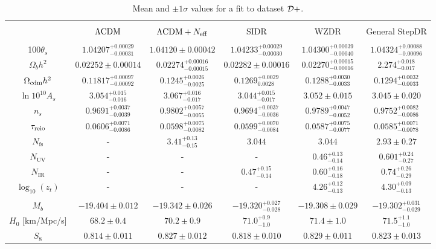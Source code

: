 \documentclass[aps,prd,twocolumn,nofootinbib,superscriptaddress]{revtex4}
\newcommand{\D}{\cal{D}}
\newcommand{\nir}{N_\text{IR}}
\newcommand{\nuv}{N_\text{UV}}
\newcommand{\nfs}{N_\text{fs}}
\newcommand{\zt}{z_t}
\newcommand{\Neff}{N_{\rm eff}}
\begin{document}
\begin{table*}[h!]{ }
	\centering
	\begin{tabular}{|c | c | c | c | c | c |} 
		\hline &&&&&\\[-8pt]
		& $\Lambda{\rm CDM}$ & $ \Lambda{\rm CDM} + \Neff$ & SIDR &  WZDR & General StepDR  \\
		\hline &&&&&\\[-8pt]
		100$\theta_s$ & $1.04207 ^{+0.00029}_{-0.00031}$ & $1.04120 \pm 0.00042$ & $1.04233^{+0.00029}_{-0.00030}$ & $1.04300^{+0.00039}_{-0.00040}$ & $1.04324^{+0.00088}_{-0.00096}$  \\  [3pt]
		$\Omega_b h^2$ & $0.02252\pm 0.00014 $ & $0.02274^{+0.00016}_{-0.00015}$  & $0.02282 \pm  0.00016 $ &  $0.02270^{+0.00015}_{-0.00016}$ &$ 2.274^{+0.018}_{-0.017} $   \\ [3pt]
		$ \Omega_{\rm cdm}h^2$ & $ 0.11817^{+0.00097}_{-0.00092}$ & $0.1245^{+0.0026}_{-0.0025}$ & $0.1269^{+0.0029}_{0.0028} $ & $0.1288^{+0.0030}_{-0.0033}$ & $0.1294^{+0.0032}_{-0.0033} $\\ [3pt]
		$\ln 10^{10} A_s$  &	$3.054^{+0.015}_{-0.016} $ & $3.067^{+0.016}_{-0.017} $ & $3.044^{+0.015}_{-0.017} $ & $3.052 \pm 0.015 $ &$3.045 \pm 0.020 $ \\ [3pt]
		$n_s$ & $0.9691^{+0.0037}_{-0.0039}$& $0.9802^{+0.0057}_{-0.0055} $ & $0.9694^{+0.0037}_{-0.0036} $ & $0.9789^{+0.0047}_{-0.0052} $ &$0.9752^{+0.0082}_{-0.0086}$\\ [3pt]
		$\tau_{\rm reio}$ &$0.0606^{+0.0071}_{-0.0086}$ & $0.0598^{+0.0075}_{-0.0082} $ & $0.0599^{+0.0070}_{-0.0084} $ & $0.0587^{+0.0075}_{-0.0077} $ &$0.0585^{+0.0071}_{-0.0078}$ \\ [3pt]
		$\nfs   $  &- & $3.41 ^{+0.13}_{-0.15} $ & $3.044$ & $3.044 $& $2.93 \pm 0.27 $  \\ [3pt]
		$\nuv $  &-&-&-& $0.46^{+0.13}_{-0.14} $ & $0.601^{+0.24}_{-0.27} $  \\ [3pt]			
		$\nir $  &- &-& $0.47^{+0.15}_{-0.14} $ & $0.60^{+0.16}_{-0.18}$ & $0.74^{+0.26}_{-0.29} $  \\ [3pt]
		$\log_{10} (\zt)$  &- &- &- & $4.26^{+0.12}_{-0.13} $ & $4.30^{+0.09}_{-0.13} $ \\ [3pt] \hline	 &&&&&\\[-8pt]
		$M_b $ & ${-19.404} \pm 0.012 $ & $ {-19.342} \pm 0.026 $ & $ {-19.320}^{+0.027}_{-0.028}$ & $ {-19.308} \pm 0.029$ & ${-19.302}^{+0.031}_{-0.029} $ \\ [3pt]
		$H_0$ [km/Mpc/s] & $68.2 \pm 0.4 $ &  $70.2 \pm 0.9 $ & $71.0^{+0.9}_{-1.0} $ & $71.4 \pm 1.0 $ & $71.5^{+1.1}_{-1.0} $ \\ [3pt]
		$S_8$ & $0.814  \pm 0.011 $& $0.827 \pm 0.012 $ & $0.818 \pm 0.010 $ & $0.829 \pm 0.011 $ &$0.823 \pm 0.013$  \\  [3pt] \hline
		
	\end{tabular}
	\caption{Mean and $\pm 1 \sigma$ values for a fit to dataset $\D+$.}
	\label{tb:meanDp}
\end{table*}
\end{document}
